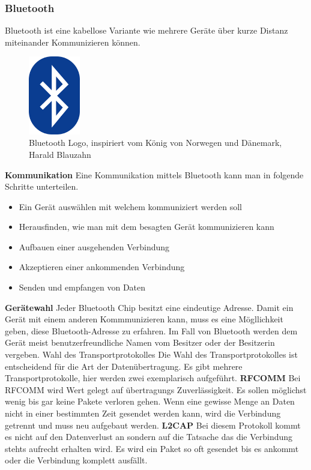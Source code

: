 \subsubsection{Bluetooth}
\label{subsec:Bluetooth}
Bluetooth ist eine kabellose Variante wie mehrere Geräte über kurze Distanz miteinander Kommunizieren können.

\begin{figure}
  \begin{center}
    \includegraphics[width=0.2\textwidth]{images/bluetooth}
  \end{center}
  \caption{Bluetooth Logo, inspiriert vom König von Norwegen und Dänemark, Harald Blauzahn \cite{PERT.CH2-bluetooth.logo}}\label{Fig:imgBluetoothLogo}
\end{figure}

\textbf{Kommunikation\newline}
Eine Kommunikation mittels Bluetooth kann man in folgende Schritte unterteilen.
\nextline
\begin{itemize}
\item Ein Gerät auswählen mit welchem kommuniziert werden soll
\item Herausfinden, wie man mit dem besagten Gerät kommunizieren kann
\item Aufbauen einer ausgehenden Verbindung
\item Akzeptieren einer ankommenden Verbindung
\item Senden und empfangen von Daten
\end{itemize}
\textbf{Gerätewahl\nextline}
Jeder Bluetooth Chip besitzt eine eindeutige Adresse. Damit ein Gerät mit einem anderen Kommmunizieren kann, muss es eine Mögllichkeit geben, diese Bluetooth-Adresse zu erfahren. Im Fall von Bluetooth werden dem Gerät meist benutzerfreundliche Namen vom Besitzer oder der Besitzerin vergeben.
Wahl des Transportprotokolles
Die Wahl des Transportprotokolles ist entscheidend für die Art der Datenübertragung. Es gibt mehrere Transportprotokolle, hier werden zwei exemplarisch aufgeführt.
\nextline
\textbf{RFCOMM\nextline}
Bei RFCOMM wird Wert gelegt auf übertragungs Zuverlässigkeit. Es sollen möglichst wenig bis gar keine Pakete verloren gehen. Wenn eine gewisse Menge an Daten nicht in einer bestimmten Zeit gesendet werden kann, wird die Verbindung getrennt und muss neu aufgebaut werden.
\nextline
\textbf{L2CAP\nextline}
Bei diesem Protokoll kommt es nicht auf den Datenverlust an sondern auf die Tatsache das die Verbindung stehts aufrecht erhalten wird. Es wird ein Paket so oft gesendet bis es ankommt oder die Verbindung komplett ausfällt.
